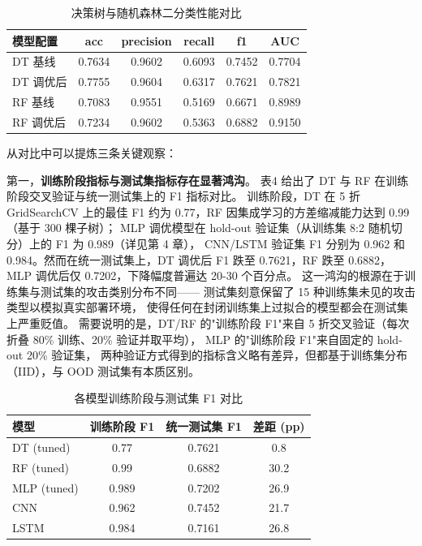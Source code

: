\begin{table}[htbp]
  \centering
  \caption{决策树与随机森林二分类性能对比}
  \label{tab:dt-rf-compare}
  \small
  \begin{tabular}{lccccc}
    \toprule
    模型配置 & acc & precision & recall & f1 & AUC \\
    \midrule
    DT 基线         & 0.7634 & 0.9602 & 0.6093 & 0.7452 & 0.7704 \\
    DT 调优后       & 0.7755 & 0.9604 & 0.6317 & 0.7621 & 0.7821 \\
    RF 基线         & 0.7083 & 0.9551 & 0.5169 & 0.6671 & 0.8989 \\
    RF 调优后       & 0.7234 & 0.9602 & 0.5363 & 0.6882 & 0.9150 \\
    \bottomrule
  \end{tabular}
\end{table}

从对比中可以提炼三条关键观察：

第一，\textbf{训练阶段指标与测试集指标存在显著鸿沟}。
表4 给出了 DT 与 RF 在训练阶段交叉验证与统一测试集上的 F1 指标对比。
训练阶段，DT 在 5 折 GridSearchCV 上的最佳 F1 约为 0.77，RF 因集成学习的方差缩减能力达到 0.99（基于 300 棵子树）；
MLP 调优模型在 hold-out 验证集（从训练集 8:2 随机切分）上的 F1 为 0.989（详见第 4 章），
CNN/LSTM 验证集 F1 分别为 0.962 和 0.984。然而在统一测试集上，DT 调优后 F1 跌至 0.7621，RF 跌至 0.6882，
MLP 调优后仅 0.7202，下降幅度普遍达 20-30 个百分点。
这一鸿沟的根源在于训练集与测试集的攻击类别分布不同——
测试集刻意保留了 15 种训练集未见的攻击类型以模拟真实部署环境，
使得任何在封闭训练集上过拟合的模型都会在测试集上严重贬值。
需要说明的是，DT/RF 的"训练阶段 F1"来自 5 折交叉验证（每次折叠 80\% 训练、20\% 验证并取平均），
MLP 的"训练阶段 F1"来自固定的 hold-out 20\% 验证集，
两种验证方式得到的指标含义略有差异，但都基于训练集分布（IID），与 OOD 测试集有本质区别。

\begin{table}[htbp]
  \centering
  \caption{各模型训练阶段与测试集 F1 对比}
  \label{tab:train-vs-test}
  \small
  \begin{tabular}{lccc}
    \toprule
    模型 & 训练阶段 F1 & 统一测试集 F1 & 差距 (pp) \\
    \midrule
    DT  (tuned)      & 0.77 & 0.7621 & 0.8 \\
    RF  (tuned)      & 0.99 & 0.6882 & 30.2 \\
    MLP (tuned)      & 0.989 & 0.7202 & 26.9 \\
    CNN              & 0.962 & 0.7452 & 21.7 \\
    LSTM             & 0.984 & 0.7161 & 26.8 \\
    \bottomrule
  \end{tabular}
\end{table}

